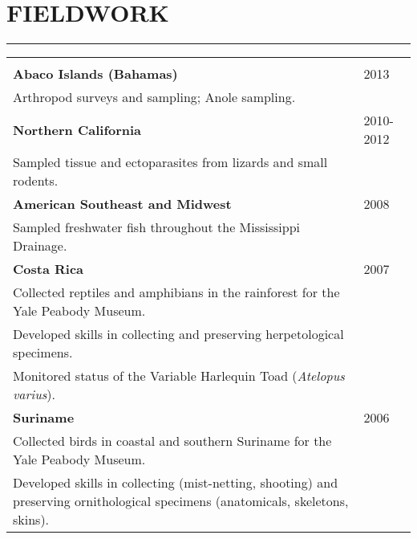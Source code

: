 \documentclass{article}
\begin{document}
\section*{FIELDWORK}
\vspace{-0.6cm}
\rule{470pt}{0.4pt}
\begin{tabular}{>{\everypar{\hangindent1cm}}p{}p{}}
\hfill\\
\textbf{Abaco Islands (Bahamas)} & \hfill 2013\\
\hspace{4.5mm}Arthropod surveys and sampling; Anole sampling.\\
%
\textbf{Northern California} & \hfill 2010-2012\\
\hspace{4.5mm}Sampled tissue and ectoparasites from lizards and small rodents.\\
%
\textbf{American Southeast and Midwest} & \hfill 2008\\ 
\hspace{4.5mm}Sampled freshwater fish throughout the Mississippi Drainage.\\
%
\textbf{Costa Rica}  & \hfill  2007\\ 
\hspace{4.5mm}Collected reptiles and amphibians in the rainforest for the Yale Peabody Museum.\\ 
\hspace{4.5mm}Developed skills in collecting and preserving herpetological specimens.\\
\hspace{4.5mm}Monitored status of the Variable Harlequin Toad (\textit{Atelopus varius}).\\
%
\textbf{Suriname}  & \hfill  2006\\
\hspace{4.5mm}Collected birds in coastal and southern Suriname for the Yale Peabody Museum.\\ 
\hspace{4.5mm}Developed skills in collecting (mist-netting, shooting) and preserving ornithological specimens (anatomicals, skeletons, skins).\\ 
\end{tabular}
\end{document}
